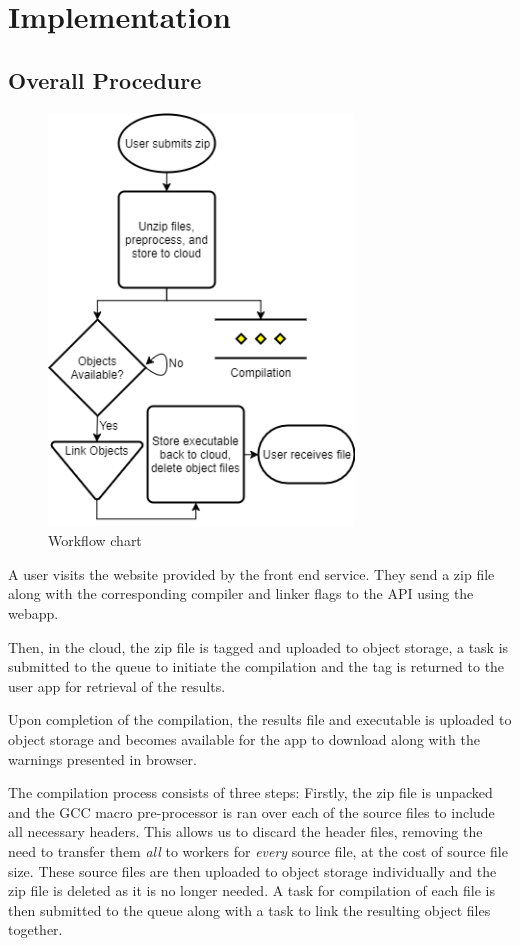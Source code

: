 \documentclass[conference]{IEEEtran}
\begin{document}

\section{Implementation}
\subsection{Overall Procedure}
\begin{figure}[ht] %
    \centering
    \includegraphics[width=3.2in]{WorkArchitecture.png}
    \caption{Workflow chart}
    \label{fig:overview}
\end{figure}

A user visits the website provided by the front end service. They send a zip file along with the corresponding compiler and linker flags to the API using the webapp.

Then, in the cloud, the zip file is tagged and uploaded to object storage, a task is submitted to the queue to initiate the compilation and the tag is returned to the user app for retrieval of the results.

Upon completion of the compilation, the results file and executable is uploaded
to object storage and becomes available for the app to download along with the
warnings presented in browser.

The compilation process consists of three steps:
Firstly, the zip file is unpacked and the GCC macro pre-processor is ran over each of
the source files to include all necessary headers. This allows us to discard the
header files, removing the need to transfer them \emph{all} to workers for
\emph{every} source file, at the cost of source file size. These source files
are then uploaded to object storage individually and the zip file is deleted as it is no longer needed. A task for compilation of each file is then submitted to the queue along with a task to link the resulting object files together.
\end{document}
